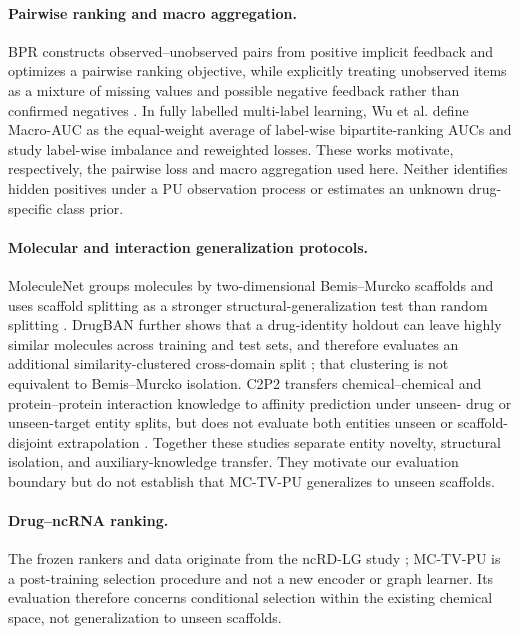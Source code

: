 \documentclass[preprint,review,12pt]{elsarticle}
\begin{document}
\paragraph{Pairwise ranking and macro aggregation.}
BPR constructs observed--unobserved pairs from positive implicit feedback and
optimizes a pairwise ranking objective, while explicitly treating unobserved
items as a mixture of missing values and possible negative feedback rather
than confirmed negatives \citep{rendle2009bpr}. In fully labelled multi-label
learning, Wu et al. \citep{pmlr-v202-wu23l} define Macro-AUC as the equal-weight average
of label-wise bipartite-ranking AUCs and study label-wise imbalance and
reweighted losses. These works motivate, respectively, the pairwise loss and
macro aggregation used here. Neither identifies hidden positives under a PU
observation process or estimates an unknown drug-specific class prior.

\paragraph{Molecular and interaction generalization protocols.}
MoleculeNet groups molecules by two-dimensional Bemis--Murcko scaffolds and
uses scaffold splitting as a stronger structural-generalization test than
random splitting \citep{wu2018moleculenet}. DrugBAN further shows that a
drug-identity holdout can leave highly similar molecules across training and
test sets, and therefore evaluates an additional similarity-clustered
cross-domain split \citep{bai2023drugban}; that clustering is not equivalent
to Bemis--Murcko isolation. C2P2 transfers chemical--chemical and
protein--protein interaction knowledge to affinity prediction under unseen-
drug or unseen-target entity splits, but does not evaluate both entities
unseen or scaffold-disjoint extrapolation \citep{nguyen2022coldstartdta}.
Together these studies separate entity novelty, structural isolation, and
auxiliary-knowledge transfer. They motivate our evaluation boundary but do not
establish that MC-TV-PU generalizes to unseen scaffolds.

\paragraph{Drug--ncRNA ranking.}
The frozen rankers and data originate from the ncRD-LG study
\citep{xie2026ncrdlg}; MC-TV-PU is a post-training selection procedure and not a
new encoder or graph learner. Its evaluation therefore concerns conditional
selection within the existing chemical space, not generalization to unseen
scaffolds.
\end{document}
